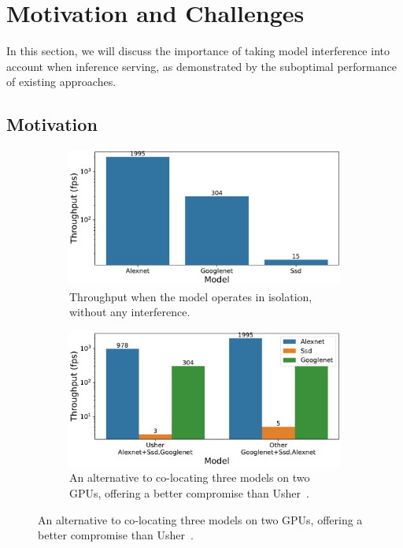 \section{Motivation and Challenges}\label{sec:motivation}


In this section, we will discuss the importance of taking model interference
into account when inference serving, as demonstrated by the suboptimal
performance of existing approaches.


\subsection{Motivation}

\begin{figure}
	\centering
	\begin{subfigure}[t]{0.45\textwidth}
		\centering
		\includegraphics[width=\textwidth]{chapters/roomie/images/Throughput_models_in_isolation.pdf}
		\caption{Throughput when the model operates in isolation, without any interference.}
		\label{fig:isolation}
	\end{subfigure}
	\hfill
	\begin{subfigure}[t]{0.45\textwidth}
		\centering
		\includegraphics[width=\textwidth]{chapters/roomie/images/Throughput_models_in_combinaison.pdf}
		\caption{An alternative to co-locating three models on two GPUs, offering a better compromise than Usher~\cite{shubha2024usher}.}
		\label{fig:colocation}
	\end{subfigure}
	\label{fig:three graphs}
\end{figure}

